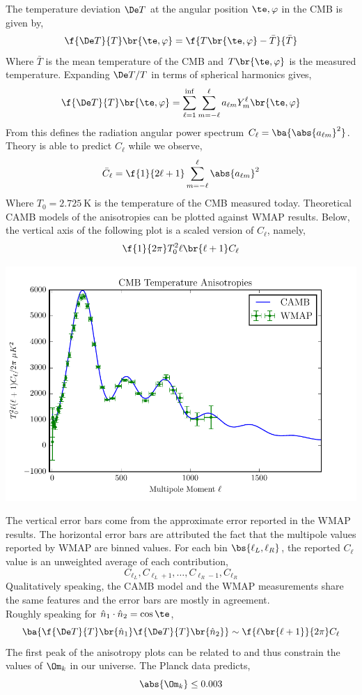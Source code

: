 \documentclass{article}
\begin{document}
The temperature deviation $\De T$ at the angular position $\te, \varphi$ in the CMB is given by,
\[ \f{\De T}{T} \br{\te, \varphi} = \f{T\br{\te, \varphi} - \bar T}{\bar T} \]
Where $\bar T$ is the mean temperature of the CMB and $T\br{\te, \varphi}$ is the measured temperature. Expanding $\De T/ T$ in terms of spherical harmonics gives,
\[ \f{\De T}{T} \br{\te, \varphi} = \sum_{\ell = 1}^{\inf} \sum_{m = -\ell}^{\ell} a_{\ell m} Y_{m}^{\ell} \br{\te, \varphi} \]
From this defines the radiation angular power spectrum $C_{\ell} = \ba{\abs{a_{\ell m}}^2}$. Theory is able to predict $C_{\ell}$ while we observe,
\[ \bar C_{\ell} = \f{1}{2\ell + 1} \sum_{m = - \ell}^{\ell} \abs{a_{\ell m}}^2 \]
Where $T_0 = \SI{2.725}{\K}$ is the temperature of the CMB measured today. Theoretical CAMB models of the anisotropies can be plotted against WMAP results. Below, the vertical axis of the following plot is a scaled version of $C_{\ell}$, namely,
\[ \f{1}{2 \pi}T_0^2 \ell \br{\ell + 1} C_{\ell} \]
\begin{center}
    \includegraphics{figures/anisotropies.pdf}
\end{center}
The vertical error bars come from the approximate error reported in the WMAP results. The horizontal error bars are attributed the fact that the multipole values reported by WMAP are binned values. For each bin $\bs{\ell_L, \ell_R}$, the reported $C_{\ell}$ value is an unweighted average of each contribution,
\[ C_{\ell_L}, C_{\ell_{L}+1}, \ldots, C_{\ell_{R}-1}, C_{\ell_{R}}  \]
Qualitatively speaking, the CAMB model and the WMAP measurements share the same features and the error bars are mostly in agreement. \\

Roughly speaking for $\hat n_1 \cdot \hat n_2 = \cos \te$,
\[ \ba{\f{\De T}{T}\br{\hat n_1}\f{\De T}{T}\br{\hat n_2}} \sim \f{\ell \br{\ell + 1}}{2 \pi} C_\ell  \]
The first peak of the anisotropy plots can be related to and thus constrain the values of $\Om_k$ in our universe. The Planck data predicts,
\[ \abs{\Om_k} \leq 0.003 \]
\end{document}
